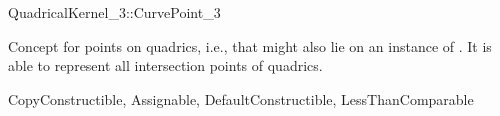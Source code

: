 \begin{ccRefConcept}{QuadricalKernel_3::CurvePoint_3}

\ccDefinition

Concept for points on quadrics, i.e., that might also lie
on an instance of . It is able to represent all 
intersection points of quadrics.

\ccRefines
CopyConstructible, Assignable, DefaultConstructible, LessThanComparable


\ccSeeAlso


\end{ccRefConcept}

